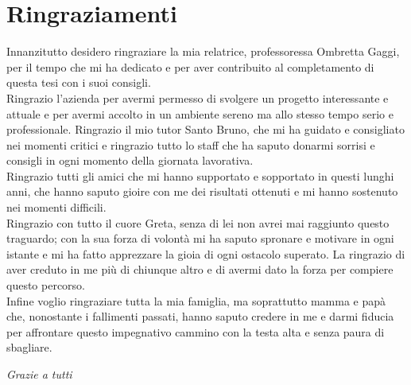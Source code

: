 
\bigskip

\begingroup
\let\clearpage\relax
\let\cleardoublepage\relax
\let\cleardoublepage\relax
\chapter*{Ringraziamenti}
Innanzitutto desidero ringraziare la mia relatrice, professoressa Ombretta Gaggi, per il tempo che mi ha dedicato e per aver contribuito al completamento di questa tesi con i suoi consigli.\\

Ringrazio l'azienda \myCompany per avermi permesso di svolgere un progetto interessante e attuale e per avermi accolto in un ambiente sereno ma allo stesso tempo serio e professionale.
Ringrazio il mio tutor Santo Bruno, che mi ha guidato e consigliato nei momenti critici e ringrazio tutto lo staff che ha saputo donarmi sorrisi e consigli in ogni momento della giornata lavorativa.\\

Ringrazio tutti gli amici che mi hanno supportato e sopportato in questi lunghi anni, che hanno saputo gioire con me dei risultati ottenuti e mi hanno sostenuto nei momenti difficili.\\

Ringrazio con tutto il cuore Greta, senza di lei non avrei mai raggiunto questo traguardo; con la sua forza di volontà mi ha saputo spronare e motivare in ogni istante e mi ha fatto apprezzare la gioia di ogni ostacolo superato. La ringrazio di aver creduto in me più di chiunque altro e di avermi dato la forza per compiere questo percorso.\\

Infine voglio ringraziare tutta la mia famiglia, ma soprattutto mamma e papà che, nonostante i fallimenti passati, hanno saputo credere in me e darmi fiducia per affrontare questo impegnativo cammino con la testa alta e senza paura di sbagliare.

\vspace{2cm}

\begin{center}
\emph{Grazie a tutti}
\end{center}

\endgroup




